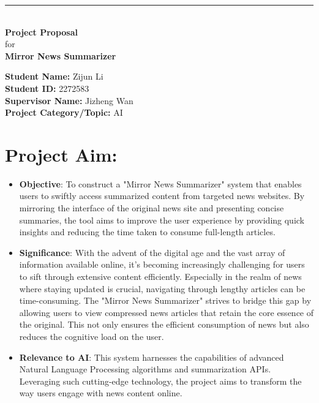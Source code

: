\documentclass[a4paper]{article}
\begin{document}

\begin{titlepage}
	
	\rule{\linewidth}{5pt}
	\raggedleft
	\fontsize{38pt}{50pt}\selectfont
    \textbf{\\Project Proposal\\}
    \fontsize{28pt}{60pt}\selectfont 
    for\\
    \fontsize{38pt}{60pt}\selectfont 
    \textbf{Mirror News Summarizer\\}
	
	\vfill %
	
	
	\parbox[t]{0.93\textwidth}{ %
		\raggedleft %
		\large %
		{\bf Student Name:} Zijun Li\\
        {\bf Student ID:} 2272583\\
        {\bf Supervisor Name:} Jizheng Wan\\
        {\bf Project Category/Topic:} AI\\
	}
	
\end{titlepage}

\section{Project Aim:}

\begin{itemize}
    \item {\bf Objective}: To construct a "Mirror News Summarizer" system that enables users to swiftly access summarized content from targeted news websites. By mirroring the interface of the original news site and presenting concise summaries, the tool aims to improve the user experience by providing quick insights and reducing the time taken to consume full-length articles.
    \item {\bf Significance}: With the advent of the digital age and the vast array of information available online, it's becoming increasingly challenging for users to sift through extensive content efficiently. Especially in the realm of news where staying updated is crucial, navigating through lengthy articles can be time-consuming. The "Mirror News Summarizer" strives to bridge this gap by allowing users to view compressed news articles that retain the core essence of the original. This not only ensures the efficient consumption of news but also reduces the cognitive load on the user.
    \item {\bf Relevance to AI}: This system harnesses the capabilities of advanced Natural Language Processing algorithms and summarization APIs. Leveraging such cutting-edge technology, the project aims to transform the way users engage with news content online.
\end{itemize}
\end{document}
